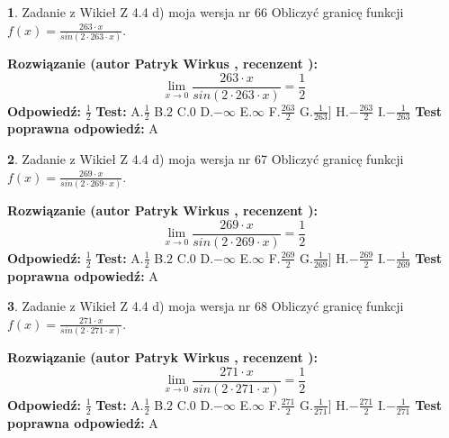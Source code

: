 \documentclass[12pt, a4paper]{article}
\theoremstyle{definition} %
\newtheorem{zad}{}
\newcommand{\zadStart}[1]{\begin{zad}#1\newline}
\newcommand{\zadStop}{\end{zad}}
\newcommand{\rozwStart}[2]{\noindent \textbf{Rozwiązanie (autor #1 , recenzent #2): }\newline}
\newcommand{\rozwStop}{\newline}
\newcommand{\odpStart}{\noindent \textbf{Odpowiedź:}\newline}
\newcommand{\odpStop}{\newline}
\newcommand{\testStart}{\noindent \textbf{Test:}\newline}
\newcommand{\testStop}{\newline}
\newcommand{\kluczStart}{\noindent \textbf{Test poprawna odpowiedź:}\newline}
\newcommand{\kluczStop}{\newline}
\begin{document}
\zadStart{Zadanie z Wikieł Z 4.4 d) moja wersja nr 66}
Obliczyć granicę funkcji $f(x)=\frac{263\cdot x}{sin(2 \cdot263\cdot x)}$.
\zadStop
\rozwStart{Patryk Wirkus}{}
$$\lim\limits_{x\to 0}\frac{263\cdot x}{sin(2 \cdot263\cdot x)}=\frac{1}{2}$$
\rozwStop
\odpStart
$\frac{1}{2}$
\odpStop
\testStart
A.$\frac{1}{2}$
B.$2$
C.$0$
D.$-\infty$
E.$\infty$
F.$\frac{263}{2}$
G.$\frac{1}{263}]$
H.$-\frac{263}{2}$
I.$-\frac{1}{263}$
\testStop
\kluczStart
A
\kluczStop



\zadStart{Zadanie z Wikieł Z 4.4 d) moja wersja nr 67}
Obliczyć granicę funkcji $f(x)=\frac{269\cdot x}{sin(2 \cdot269\cdot x)}$.
\zadStop
\rozwStart{Patryk Wirkus}{}
$$\lim\limits_{x\to 0}\frac{269\cdot x}{sin(2 \cdot269\cdot x)}=\frac{1}{2}$$
\rozwStop
\odpStart
$\frac{1}{2}$
\odpStop
\testStart
A.$\frac{1}{2}$
B.$2$
C.$0$
D.$-\infty$
E.$\infty$
F.$\frac{269}{2}$
G.$\frac{1}{269}]$
H.$-\frac{269}{2}$
I.$-\frac{1}{269}$
\testStop
\kluczStart
A
\kluczStop



\zadStart{Zadanie z Wikieł Z 4.4 d) moja wersja nr 68}
Obliczyć granicę funkcji $f(x)=\frac{271\cdot x}{sin(2 \cdot271\cdot x)}$.
\zadStop
\rozwStart{Patryk Wirkus}{}
$$\lim\limits_{x\to 0}\frac{271\cdot x}{sin(2 \cdot271\cdot x)}=\frac{1}{2}$$
\rozwStop
\odpStart
$\frac{1}{2}$
\odpStop
\testStart
A.$\frac{1}{2}$
B.$2$
C.$0$
D.$-\infty$
E.$\infty$
F.$\frac{271}{2}$
G.$\frac{1}{271}]$
H.$-\frac{271}{2}$
I.$-\frac{1}{271}$
\testStop
\kluczStart
A
\kluczStop
\end{document}
